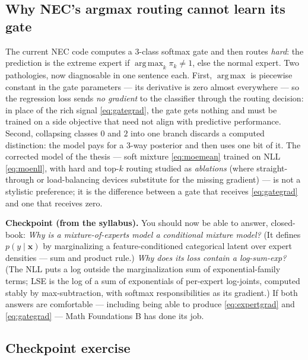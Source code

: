 \documentclass[11pt]{article}
\numberwithin{equation}{section}
\theoremstyle{plain}
\theoremstyle{definition}
\theoremstyle{remark}
\newcounter{exercise}
\DeclareMathOperator*{\argmax}{arg\,max}
\newcommand{\x}{\bm{x}}
\begin{document}
\subsection{Why NEC's argmax routing cannot learn its gate}

The current NEC code computes a 3-class softmax gate and then routes \emph{hard}: the prediction is the extreme expert if $\argmax_k \pi_k \ne 1$, else the normal expert. Two pathologies, now diagnosable in one sentence each. First, $\argmax$ is piecewise constant in the gate parameters --- its derivative is zero almost everywhere --- so the regression loss sends \emph{no gradient} to the classifier through the routing decision: in place of the rich signal \eqref{eq:gategrad}, the gate gets nothing and must be trained on a side objective that need not align with predictive performance. Second, collapsing classes $0$ and $2$ into one branch discards a computed distinction: the model pays for a 3-way posterior and then uses one bit of it. The corrected model of the thesis --- soft mixture \eqref{eq:moemean} trained on NLL \eqref{eq:moenll}, with hard and top-$k$ routing studied as \emph{ablations} (where straight-through or load-balancing devices substitute for the missing gradient) --- is not a stylistic preference; it is the difference between a gate that receives \eqref{eq:gategrad} and one that receives zero.

\medskip
\noindent\textbf{Checkpoint (from the syllabus).} You should now be able to answer, closed-book: \emph{Why is a mixture-of-experts model a conditional mixture model?} (It defines $p(y \mid \x)$ by marginalizing a feature-conditioned categorical latent over expert densities --- sum and product rule.) \emph{Why does its loss contain a log-sum-exp?} (The NLL puts a log outside the marginalization sum of exponential-family terms; LSE is the log of a sum of exponentials of per-expert log-joints, computed stably by max-subtraction, with softmax responsibilities as its gradient.) If both answers are comfortable --- including being able to produce \eqref{eq:expertgrad} and \eqref{eq:gategrad} --- Math Foundations B has done its job.


\subsection*{Checkpoint exercise}
\end{document}
